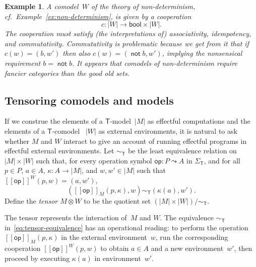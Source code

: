 \documentclass{amsart}
\newcommand{\theory}[1]{\mathsf{#1}} %
\newcommand{\signature}[1]{\Sigma_{\theory{#1}}} %
\newcommand{\carrier}[1]{|#1|} %
\newcommand{\opdecl}[3]{#1 : #2 \leadsto #3} %
\newcommand{\sem}[1]{[\![#1]\!]} %
\newcommand{\bool}{\mathsf{bool}} %
\newcommand{\tensor}[2]{#1 \otimes #2} %
\newcommand{\kode}[1]{\mathsf{#1}}
\newtheorem{example}{Example}[section]
\begin{document}
\begin{example}
  A comodel~$W$ of the theory of non-determinism, cf.\
  Example~\ref{ex:non-determinism}, is given by a cooperation
  \begin{equation*}
    c : \carrier{W} \to \bool \times \carrier{W}.
  \end{equation*}
  The cooperation must satisfy (the interpretations of) associativity,
  idempotency, and commutativity. Commutativity is problematic because we get
  from it that if $c(w) = (b, w')$ then also
  $c(w) = (\mathop{\mathsf{not}} b, w')$, implying the nonsensical requirement
  $b = \mathop{\mathsf{not}} b$. It appears that comodels of non-determinism require
  fancier categories than the good old sets.
\end{example}

\subsection{Tensoring comodels and models}
\label{sec:tens-comod-models}


If we construe the elements of a $\theory{T}$-model~$\carrier{M}$ as effectful
computations and the elements of a $\theory{T}$-comodel ~$\carrier{W}$ as
external environments, it is natural to ask whether $M$ and $W$ interact to give
an account of running effectful programs in effectful external environments.
%
Let $\sim_\theory{T}$ be the least equivalence relation
on~$\carrier{M} \times \carrier{W}$ such that, for every operation symbol
$\opdecl{\kode{op}}{P}{A}$ in $\signature{T}$, and for all $p \in P$, $a \in A$,
$\kappa : A \to \carrier{M}$, and $w, w' \in \carrier{M}$ such that
$\sem{\kode{op}}^W(p, w) = (a, w')$,
%
\begin{equation}
  \label{eq:tensor-equivalence}
  (\sem{\kode{op}}_M(p, \kappa), w) \sim_\theory{T} (\kappa(a), w').
\end{equation}
%
Define the \emph{tensor $\tensor{M}{W}$} to be the quotient set
$(\carrier{M} \times \carrier{W})/{\sim_\theory{T}}$.

The tensor represents the interaction of~$M$ and $W$. The equivalence
$\sim_\theory{T}$ in~\eqref{eq:tensor-equivalence} has an operational reading:
to perform the operation $\sem{\kode{op}}_M(p, \kappa)$ in the external
environment~$w$, run the corresponding cooperation $\sem{\kode{op}}^W(p, w)$ to
obtain $a \in A$ and a new environment~$w'$, then proceed by executing
$\kappa(a)$ in environment~$w'$.
\end{document}
